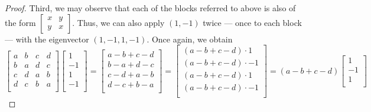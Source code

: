 \documentclass[../psets.tex]{subfiles}
\begin{document}
\begin{enumerate}
\begin{enumerate}
\begin{proof}
            Third, we may observe that each of the blocks referred to above is also of the form $
                [
                    \begin{smallmatrix}
                        x & y\\
                        y & x
                    \end{smallmatrix}
                ]
            $. Thus, we can also apply $(1,-1)$ twice --- once to each block --- with the eigenvector $(1,-1,1,-1)$. Once again, we obtain
            \begin{equation*}
                \begin{bmatrix}
                    a & b & c & d\\
                    b & a & d & c\\
                    c & d & a & b\\
                    d & c & b & a\\
                \end{bmatrix}
                \begin{bmatrix}
                    1\\
                    -1\\
                    1\\
                    -1\\
                \end{bmatrix}
                =
                \begin{bmatrix}
                    a-b+c-d\\
                    b-a+d-c\\
                    c-d+a-b\\
                    d-c+b-a\\
                \end{bmatrix}
                =
                \begin{bmatrix}
                    (a-b+c-d)\cdot 1\\
                    (a-b+c-d)\cdot -1\\
                    (a-b+c-d)\cdot 1\\
                    (a-b+c-d)\cdot -1\\
                \end{bmatrix}
                = (a-b+c-d)
                \begin{bmatrix}
                    1\\
                    -1\\
                    1\\

\end{bmatrix}
\end{equation*}
\end{proof}
\end{enumerate}
\end{enumerate}
\end{document}
